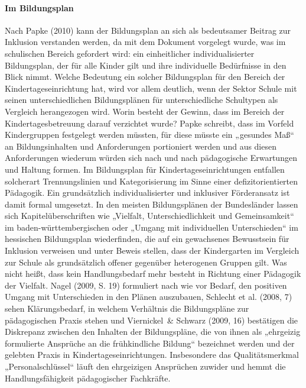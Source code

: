 \paragraph{Im Bildungsplan}
Nach Papke (2010) kann der Bildungsplan an sich als bedeutsamer Beitrag zur Inklusion verstanden werden, da mit dem Dokument vorgelegt wurde, was im schulischen Bereich gefordert wird: ein einheitlicher individualisierter Bildungsplan, der für alle Kinder gilt und ihre individuelle Bedürfnisse in den Blick nimmt. Welche Bedeutung ein solcher Bildungsplan für den Bereich der Kindertageseinrichtung hat, wird vor allem deutlich, wenn der Sektor Schule mit seinen unterschiedlichen Bildungsplänen für unterschiedliche Schultypen als Vergleich herangezogen wird. Worin besteht der Gewinn, dass im Bereich der Kindertagesbetreuung darauf verzichtet wurde? Papke schreibt, dass im Vorfeld Kindergruppen festgelegt werden müssten, für diese müsste ein „gesundes Maß“ an Bildungsinhalten und Anforderungen portioniert werden und aus diesen Anforderungen wiederum würden sich nach und nach pädagogische Erwartungen und Haltung formen. Im Bildungsplan für Kindertageseinrichtungen entfallen solcherart Trennungslinien und Kategorisierung im Sinne einer defizitorientierten Pädagogik. Ein grundsätzlich individualisierter und inklusiver Förderansatz ist damit formal umgesetzt. In den meisten Bildungsplänen der Bundesländer lassen sich Kapitelüberschriften wie „Vielfalt, Unterschiedlichkeit und Gemeinsamkeit“ im baden-württembergischen oder „Umgang mit individuellen Unterschieden“ im hessischen Bildungsplan wiederfinden, die auf ein gewachsenes Bewusstsein für Inklusion verweisen und unter Beweis stellen, dass der Kindergarten im Vergleich zur Schule als grundsätzlich offener gegenüber heterogenen Gruppen gilt. 
Was nicht heißt, dass kein Handlungsbedarf mehr besteht in Richtung einer Pädagogik der Vielfalt. Nagel (2009, S. 19) formuliert nach wie vor Bedarf, den positiven Umgang mit Unterschieden in den Plänen auszubauen, Schlecht et al. (2008, 7) sehen Klärungsbedarf, in welchem Verhältnis die Bildungspläne zur pädagogischen Praxis stehen und Viernickel~\& Schwarz (2009, 16) bestätigen die Diskrepanz zwischen den Inhalten der Bildungspläne, die von ihnen als „ehrgeizig formulierte Ansprüche an die frühkindliche Bildung“ bezeichnet werden und der gelebten Praxis in Kindertageseinrichtungen. Insbesondere das Qualitätsmerkmal „Personalschlüssel“ läuft den ehrgeizigen Ansprüchen zuwider und hemmt die Handlungsfähigkeit pädagogischer Fachkräfte.

